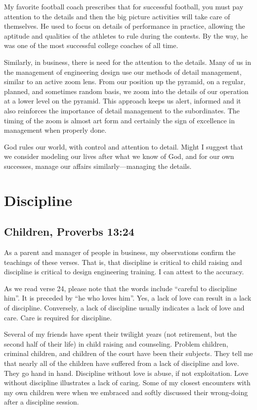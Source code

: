 \documentclass[12pt]{memoir}
\begin{document}
My favorite football coach prescribes that for successful football,
you must pay attention to the details and then the big picture activities
will take care of themselves. He used to focus on details of performance in practice, allowing the aptitude and qualities of the athletes to
rule during the contests. By the way, he was one of the most successful college coaches of all time.

Similarly, in business, there is need for the attention to the details.
Many of us in the management of engineering design use our methods
of detail management, similar to an active zoom lens. From our
position up the pyramid, on a regular, planned, and sometimes random
basis, we zoom into the details of our operation at a lower
level on the pyramid. This approach keeps us alert, informed and it
also reinforces the importance of detail management to the subordinates.
The timing of the zoom is almost art form and certainly the
sign of excellence in management when properly done.

God rules our world, with control and attention to detail. Might I
suggest that we consider modeling our lives after what we know of
God, and for our own successes, manage our affairs similarly---managing
the details.

\section{Discipline}

\subsection[Children]{Children, Proverbs 13:24}

As a parent and manager of people in business, my observations confirm
the teachings of these verses. That is, that discipline is critical
to child raising and discipline is critical to design engineering
training. I can attest to the accuracy.

As we read verse 24, please note that the words include ``careful
to discipline him''. It is preceded by ``he who loves him''. Yes,
a lack of love can result in a lack of discipline. Conversely, a lack
of discipline usually indicates a lack of love and care. Care is required for discipline.

Several of my friends have spent their twilight years (not retirement,
but the second half of their life) in child raising and counseling.
Problem children, criminal children, and children of the court have
been their subjects. They tell me that nearly all of the children
have suffered from a lack of discipline and love. They go hand in
hand. Discipline without love is abuse, if not exploitation. Love
without discipline illustrates a lack of caring. Some of my closest encounters with my own children were when we embraced and softly discussed their wrong-doing after a discipline session.
\end{document}
